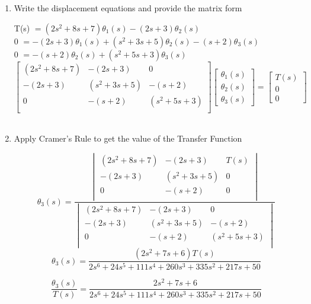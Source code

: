 ﻿\documentclass[11pt]{article}
\begin{document}
\begin{enumerate}[label=(\alph*), itemindent=*, leftmargin=*, nolistsep]
\begin{center}
    \end{center}
\vspace{15pt}
    \item Write the displacement equations and provide the matrix form
\begin{center}
    T(s) $= (2s^2 + 8s + 7)\theta_1(s) - (2s + 3)\theta_2(s)$\\
    0 $= -(2s + 3)\theta_1(s) + (s^2 + 3s + 5)\theta_2(s) - (s + 2)\theta_3(s)$\\
    0 $= -(s + 2)\theta_2(s) + (s^2 + 5s + 3)\theta_3(s)$\\
    \[
        \begin{bmatrix}
        (2s^2 + 8s + 7) & -(2s + 3) & 0\\
        -(2s + 3) & (s^2 + 3s + 5) & -(s + 2)\\
        0 & -(s + 2) & (s^2 + 5s + 3)\\
        \end{bmatrix}
        \begin{bmatrix}
        \theta_1(s) \\
        \theta_2(s) \\
        \theta_3(s)
        \end{bmatrix}
        =
        \begin{bmatrix}
        T(s)\\
        0\\
        0
        \end{bmatrix}
    \]\\
\end{center}
\vspace{15pt}
    \item Apply Cramer's Rule to get the value of the Transfer Function
\begin{center}
    \[
        \theta_3(s) = 
            \frac{\begin{vmatrix}
                (2s^2 + 8s + 7) & -(2s + 3) & T(s)\\
                -(2s + 3) & (s^2 + 3s + 5) & 0\\
                0 & -(s + 2) & 0\\
            \end{vmatrix}
        }{\begin{vmatrix}
                (2s^2 + 8s + 7) & -(2s + 3) & 0\\
                -(2s + 3) & (s^2 + 3s + 5) & -(s + 2)\\
                0 & -(s + 2) & (s^2 + 5s + 3)\\
            \end{vmatrix}
        }
    \]
    \[
    \theta_3(s) = \frac{(2s^2 + 7s + 6)T(s)}{2s^6 + 24s^5 + 111s^4 + 260s^3 + 335s^2 + 217s + 50}
    \] 

    \[
    \boxed{\frac{\theta_3(s)}{T(s)} = \frac{2s^2 + 7s + 6}{2s^6 + 24s^5 + 111s^4 + 260s^3 + 335s^2 + 217s + 50}}
    \] 

\end{center}
\end{enumerate}
\end{document}
